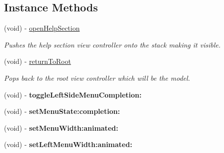\subsection*{Instance Methods}
\begin{DoxyCompactItemize}
\item 
\hypertarget{interface_m_f_side_menu_container_view_controller_a14def1b095d58eadd905ed12be837526}{(void) -\/ \hyperlink{interface_m_f_side_menu_container_view_controller_a14def1b095d58eadd905ed12be837526}{open\-Help\-Section}}\label{interface_m_f_side_menu_container_view_controller_a14def1b095d58eadd905ed12be837526}

\begin{DoxyCompactList}\small\item\em Pushes the help section view controller onto the stack making it visible. \end{DoxyCompactList}\item 
\hypertarget{interface_m_f_side_menu_container_view_controller_a3a8b7ec3ac60d621cbf41613b8be4977}{(void) -\/ \hyperlink{interface_m_f_side_menu_container_view_controller_a3a8b7ec3ac60d621cbf41613b8be4977}{return\-To\-Root}}\label{interface_m_f_side_menu_container_view_controller_a3a8b7ec3ac60d621cbf41613b8be4977}

\begin{DoxyCompactList}\small\item\em Pops back to the root view controller which will be the model. \end{DoxyCompactList}\item 
\hypertarget{interface_m_f_side_menu_container_view_controller_ab0deb7fe845f3f889cab59cdce30413b}{(void) -\/ {\bfseries toggle\-Left\-Side\-Menu\-Completion\-:}}\label{interface_m_f_side_menu_container_view_controller_ab0deb7fe845f3f889cab59cdce30413b}

\item 
\hypertarget{interface_m_f_side_menu_container_view_controller_a7e73bdb0e4c6ac09cd15a282a31e866f}{(void) -\/ {\bfseries set\-Menu\-State\-:completion\-:}}\label{interface_m_f_side_menu_container_view_controller_a7e73bdb0e4c6ac09cd15a282a31e866f}

\item 
\hypertarget{interface_m_f_side_menu_container_view_controller_a69177c8c40668aa71e60a23ae975de3b}{(void) -\/ {\bfseries set\-Menu\-Width\-:animated\-:}}\label{interface_m_f_side_menu_container_view_controller_a69177c8c40668aa71e60a23ae975de3b}

\item 
\hypertarget{interface_m_f_side_menu_container_view_controller_a57209e9a2c33ce3433427a7903da4367}{(void) -\/ {\bfseries set\-Left\-Menu\-Width\-:animated\-:}}\label{interface_m_f_side_menu_container_view_controller_a57209e9a2c33ce3433427a7903da4367}

\end{DoxyCompactItemize}
